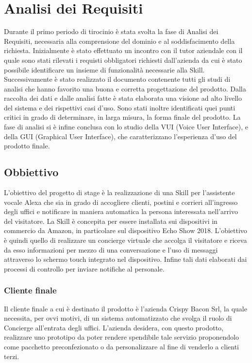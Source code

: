 
\chapter{Analisi dei Requisiti}
\label{cap:analisi_requisiti}
Durante il primo periodo di tirocinio è stata svolta la fase di Analisi dei Requisiti, necessaria alla comprensione del dominio e al soddisfacimento della richiesta. Inizialmente è stato effettuato un incontro con il tutor aziendale con il quale sono stati rilevati i requisti obbligatori richiesti dall'azienda da cui è stato possibile identificare un insieme di funzionalità necessarie alla Skill. Successivamente è stato realizzato il documento contenente tutti gli studi di analisi che hanno favorito una buona e corretta progettazione del prodotto. Dalla raccolta dei dati e dalle analisi fatte è stata elaborata una visione ad alto livello del sistema e dei rispettivi casi d’uso. Sono stati inoltre identificati quei punti critici in grado di determinare, in larga misura, la forma finale del prodotto.
La fase di analisi si è infine conclusa con lo studio della VUI (Voice User Interface), e della GUI (Graphical User Interface), che caratterizzano l'esperienza d'uso del prodotto finale. 

\section{Obbiettivo}
L’obiettivo del progetto di stage è la realizzazione di una Skill per l’assistente vocale Alexa che sia in grado di accogliere clienti, postini e corrieri all'ingresso degli uffici e notificare in maniera automatica la persona interessata nell'arrivo del visitatore. La Skill è concepita per essere installata sui dispositivi in commercio da Amazon, in particolare sul dispositivo Echo Show 2018. L’obiettivo è quindi quello di realizzare un concierge virtuale che accolga il visitatore e riceva da esso informazioni per mezzo di una conversazione e l’uso di messaggi attraverso lo schermo touch integrato nel dispositivo. Infine tali dati elaborati dai processi di controllo per inviare notifiche al personale.

\subsection{Cliente finale}
Il cliente finale a cui è destinato il prodotto è l’azienda Crispy Bacon Srl, la quale necessita, per ovvi motivi, di un sistema automatizzato che svolga il ruolo di Concierge all'entrata degli uffici. L’azienda desidera, con questo prodotto, realizzare uno prototipo da poter rendere spendibile tale servizio proponendolo come pacchetto preconfezionato o da personalizzare al fine di venderlo a clienti terzi.


